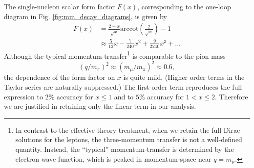 \documentclass[12pt,letterpaper]{book}
\begin{document}
The single-nucleon scalar form factor $F(x)$, corresponding to the one-loop diagram in Fig. \ref{fig:mm_decay_diagrams}, is given by
\begin{equation}
\begin{split}
F(x)&=\frac{2+x}{\sqrt{x}}\mathrm{arccot}\left(\frac{2}{\sqrt{x}}\right)-1\\
&\approx \frac{5}{12}x-\frac{7}{240}x^2+\frac{9}{2240}x^3+...
\end{split}
\end{equation}
Although the typical momentum-transfer\footnote{In contrast to the effective theory treatment, when we retain the full Dirac solutions for the leptons, the three-momentum transfer is not a well-defined quantity. Instead, the ``typical'' momentum-transfer is determined by the electron wave function, which is peaked in momentum-space near $q=m_{\mu}$.} is comparable to the pion mass 
\begin{equation}
(q/m_{\pi})^2\approx (m_{\mu}/m_{\pi})^2\approx 0.6,
\end{equation} 
the dependence of the form factor on $x$ is quite mild. (Higher order terms in the Taylor series are naturally suppressed.) The first-order term reproduces the full expression to $2\%$ accuracy for $x\leq 1$ and to $5\%$ accuracy for $1<x\leq 2$. Therefore we are justified in retaining only the linear term in our analysis.
\end{document}
